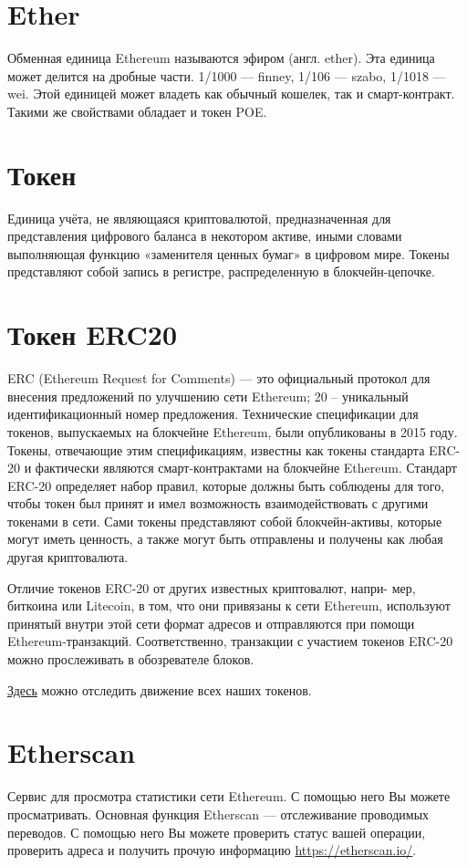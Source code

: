\documentclass[a4paper,12pt]{report}
\newcommand{\contractAddress}{0x37d29cb7d543300063a50d85389d409c01da7945}
\begin{document}
\section{Ether}
Обменная единица Ethereum называются эфиром (англ. ether). Эта единица может делится на дробные части. 1/1000 — finney, 1/106 — szabo, 1/1018 — wei. Этой единицей может владеть как обычный кошелек, так и смарт-контракт. Такими же свойствами обладает и токен POE.

\section{Токен}
Единица учёта, не являющаяся криптовалютой, предназначенная для представления цифрового баланса в некотором активе, иными словами выполняющая функцию «заменителя ценных бумаг» в цифровом мире. Токены представляют собой запись в регистре, распределенную в блокчейн-цепочке.

\section{Токен ERC20}
ERC (Ethereum Request for Comments) — это официальный протокол для внесения предложений по улучшению сети Ethereum; 20 – уникальный идентификационный номер предложения. Технические спецификации для токенов, выпускаемых на блокчейне Ethereum, были опубликованы в 2015 году. Токены, отвечающие этим спецификациям, известны как токены стандарта ERC-20 и фактически являются смарт-контрактами на блокчейне Ethereum. Стандарт ERC-20 определяет набор правил, которые должны быть
соблюдены для того, чтобы токен был принят и имел возможность взаимодействовать с другими токенами в сети. Сами токены представляют собой блокчейн-активы, которые могут иметь ценность, а также могут быть отправлены и получены как любая другая криптовалюта. 

Отличие токенов ERC-20 от других известных криптовалют, напри-
мер, биткоина или Litecoin, в том, что они привязаны к сети Ethereum, используют принятый внутри этой сети формат адресов и отправляются при помощи Ethereum-транзакций. Соответственно, транзакции с участием токенов ERC-20 можно прослеживать в обозревателе блоков.


\href{https://etherscan.io/address/\contractAddress}{Здесь} можно отследить движение всех наших токенов.


\section{Etherscan}
Сервис для просмотра статистики сети Ethereum. С помощью него Вы можете просматривать. Основная функция Etherscan — отслеживание проводимых переводов. С помощью него Вы можете проверить статус вашей операции, проверить адреса и получить прочую информацию  \href{https://etherscan.io/}{https://etherscan.io/}.
\end{document}
